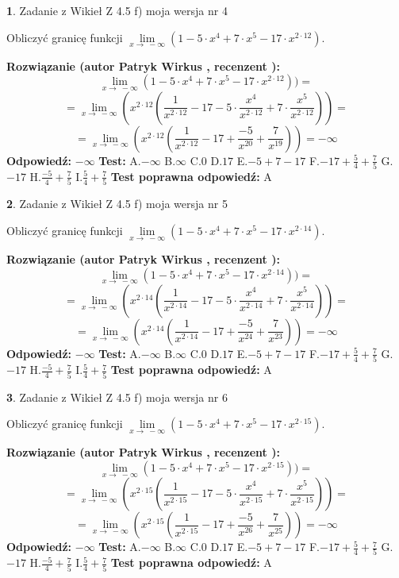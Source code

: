\documentclass[12pt, a4paper]{article}
\theoremstyle{definition} %
\newtheorem{zad}{}
\newcommand{\zadStart}[1]{\begin{zad}#1\newline}
\newcommand{\zadStop}{\end{zad}}
\newcommand{\rozwStart}[2]{\noindent \textbf{Rozwiązanie (autor #1 , recenzent #2): }\newline}
\newcommand{\rozwStop}{\newline}
\newcommand{\odpStart}{\noindent \textbf{Odpowiedź:}\newline}
\newcommand{\odpStop}{\newline}
\newcommand{\testStart}{\noindent \textbf{Test:}\newline}
\newcommand{\testStop}{\newline}
\newcommand{\kluczStart}{\noindent \textbf{Test poprawna odpowiedź:}\newline}
\newcommand{\kluczStop}{\newline}
\begin{document}
\zadStart{Zadanie z Wikieł Z 4.5 f) moja wersja nr 4}



Obliczyć granicę funkcji  $\lim\limits_{x\to\ -\infty}(1 - 5 \cdot x^{4}+7 \cdot x^{5}- 17 \cdot x^{2\cdot12})$.
\zadStop
\rozwStart{Patryk Wirkus}{}
$$\lim\limits_{x\to\ -\infty}(1 - 5 \cdot x^{4}+7 \cdot x^{5}- 17 \cdot x^{2\cdot12}))=$$
$$=\lim\limits_{x\to\ -\infty}(x^{2\cdot12}(\frac{1}{x^{2\cdot12}}-17 -5 \cdot \frac{x^{4}}{x^{2\cdot12}}+7 \cdot \frac{x^{5}}{x^{2\cdot12}}))=$$
$$=\lim\limits_{x\to\ -\infty}(x^{2\cdot12}(\frac{1}{x^{2\cdot12}}-17 + \frac{-5}{x^{20}}+ \frac{7}{x^{19}}))=-\infty$$
\rozwStop
\odpStart
$-\infty$
\odpStop
\testStart
A.$-\infty$ B.$\infty$ C.$0$ D.$17$ E.$-5 + 7 - 17$
F.$-17+\frac{5}{4}+\frac{7}{5}$ G.$-17$
H.$\frac{-5}{4}+\frac{7}{5}$
I.$\frac{5}{4}+\frac{7}{5}$
\testStop
\kluczStart
A
\kluczStop



\zadStart{Zadanie z Wikieł Z 4.5 f) moja wersja nr 5}



Obliczyć granicę funkcji  $\lim\limits_{x\to\ -\infty}(1 - 5 \cdot x^{4}+7 \cdot x^{5}- 17 \cdot x^{2\cdot14})$.
\zadStop
\rozwStart{Patryk Wirkus}{}
$$\lim\limits_{x\to\ -\infty}(1 - 5 \cdot x^{4}+7 \cdot x^{5}- 17 \cdot x^{2\cdot14}))=$$
$$=\lim\limits_{x\to\ -\infty}(x^{2\cdot14}(\frac{1}{x^{2\cdot14}}-17 -5 \cdot \frac{x^{4}}{x^{2\cdot14}}+7 \cdot \frac{x^{5}}{x^{2\cdot14}}))=$$
$$=\lim\limits_{x\to\ -\infty}(x^{2\cdot14}(\frac{1}{x^{2\cdot14}}-17 + \frac{-5}{x^{24}}+ \frac{7}{x^{23}}))=-\infty$$
\rozwStop
\odpStart
$-\infty$
\odpStop
\testStart
A.$-\infty$ B.$\infty$ C.$0$ D.$17$ E.$-5 + 7 - 17$
F.$-17+\frac{5}{4}+\frac{7}{5}$ G.$-17$
H.$\frac{-5}{4}+\frac{7}{5}$
I.$\frac{5}{4}+\frac{7}{5}$
\testStop
\kluczStart
A
\kluczStop



\zadStart{Zadanie z Wikieł Z 4.5 f) moja wersja nr 6}



Obliczyć granicę funkcji  $\lim\limits_{x\to\ -\infty}(1 - 5 \cdot x^{4}+7 \cdot x^{5}- 17 \cdot x^{2\cdot15})$.
\zadStop
\rozwStart{Patryk Wirkus}{}
$$\lim\limits_{x\to\ -\infty}(1 - 5 \cdot x^{4}+7 \cdot x^{5}- 17 \cdot x^{2\cdot15}))=$$
$$=\lim\limits_{x\to\ -\infty}(x^{2\cdot15}(\frac{1}{x^{2\cdot15}}-17 -5 \cdot \frac{x^{4}}{x^{2\cdot15}}+7 \cdot \frac{x^{5}}{x^{2\cdot15}}))=$$
$$=\lim\limits_{x\to\ -\infty}(x^{2\cdot15}(\frac{1}{x^{2\cdot15}}-17 + \frac{-5}{x^{26}}+ \frac{7}{x^{25}}))=-\infty$$
\rozwStop
\odpStart
$-\infty$
\odpStop
\testStart
A.$-\infty$ B.$\infty$ C.$0$ D.$17$ E.$-5 + 7 - 17$
F.$-17+\frac{5}{4}+\frac{7}{5}$ G.$-17$
H.$\frac{-5}{4}+\frac{7}{5}$
I.$\frac{5}{4}+\frac{7}{5}$
\testStop
\kluczStart
A
\kluczStop
\end{document}
